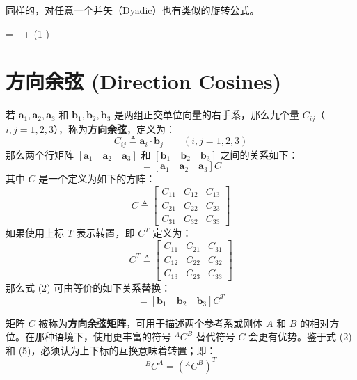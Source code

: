 同样的，对任意一个并矢（Dyadic）也有类似的旋转公式。
\begin{myformula}
      =  \cos\theta -  \times\vec{\lambda}\sin\theta + \vec{\lambda}\vec{\lambda}(1-\cos\theta)
\end{myformula}

\section{方向余弦 (Direction Cosines)}

若 \(\mathbf{a}_1, \mathbf{a}_2, \mathbf{a}_3\) 和 \(\mathbf{b}_1, \mathbf{b}_2, \mathbf{b}_3\) 是两组正交单位向量的右手系，那么九个量 \(C_{ij}\)（\(i, j = 1, 2, 3\)），称为\textbf{方向余弦}，定义为：
\begin{equation}
C_{ij} \triangleq \mathbf{a}_i \cdot \mathbf{b}_j \qquad (i, j = 1, 2, 3) \tag{1}
\end{equation}
那么两个行矩阵 \([\mathbf{a}_1 \quad \mathbf{a}_2 \quad \mathbf{a}_3]\) 和 \([\mathbf{b}_1 \quad \mathbf{b}_2 \quad \mathbf{b}_3]\) 之间的关系如下：
\begin{equation}
[\mathbf{b}_1 \quad \mathbf{b}_2 \quad \mathbf{b}_3] = [\mathbf{a}_1 \quad \mathbf{a}_2 \quad \mathbf{a}_3] C \tag{2}
\end{equation}
其中 \(C\) 是一个定义为如下的方阵：
\begin{equation}
C \triangleq \begin{bmatrix} 
C_{11} & C_{12} & C_{13} \\ 
C_{21} & C_{22} & C_{23} \\ 
C_{31} & C_{32} & C_{33} 
\end{bmatrix} \tag{3}
\end{equation}
如果使用上标 \(T\) 表示转置，即 \(C^T\) 定义为：
\begin{equation}
C^T \triangleq \begin{bmatrix} 
C_{11} & C_{21} & C_{31} \\ 
C_{12} & C_{22} & C_{32} \\ 
C_{13} & C_{23} & C_{33} 
\end{bmatrix} \tag{4}
\end{equation}
那么式 (2) 可由等价的如下关系替换：
\begin{equation}
[\mathbf{a}_1 \quad \mathbf{a}_2 \quad \mathbf{a}_3] = [\mathbf{b}_1 \quad \mathbf{b}_2 \quad \mathbf{b}_3] C^T \tag{5}
\end{equation}

矩阵 \(C\) 被称为\textbf{方向余弦矩阵}，可用于描述两个参考系或刚体 \(A\) 和 \(B\) 的相对方位。在那种语境下，使用更丰富的符号 \({}^A C^B\) 替代符号 \(C\) 会更有优势。鉴于式 (2) 和 (5)，必须认为上下标的互换意味着转置；即：
\begin{equation}
{}^B C^A = ({}^A C^B)^T \tag{6}
\end{equation}

